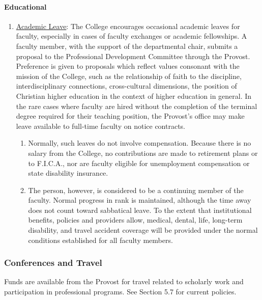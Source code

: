 			\paragraph{Educational}
				\begin{enumerate}[label=\alph*)]

					\item{\underline{Academic Leave}:  The College encourages occasional
						academic leaves for faculty, especially in cases of faculty exchanges or
						academic fellowships.  A faculty member, with the support of the
						departmental chair, submits a proposal to the Professional Development
						Committee through the Provost.  Preference is given to proposals which
						reflect values consonant with the mission of the College, such as the
						relationship of faith to the discipline, interdisciplinary connections,
						cross-cultural dimensions, the position of Christian higher education in
						the context of higher education in general.  In the rare cases where
						faculty are hired without the completion of the terminal degree required
						for their teaching position, the Provost's office may make leave
						available to full-time faculty on notice contracts.

						\begin{enumerate}[label=\arabic*)]

							\item{Normally, such leaves do not involve compensation.  Because there is no
								salary from the College, no contributions are made to retirement plans or to
								F.I.C.A., nor are faculty eligible for unemployment compensation or state
								disability insurance.}

							\item{The person, however, is considered to be a continuing member of the
								faculty. Normal progress in rank is maintained, although the time away does not
								count toward sabbatical leave.  To the extent that institutional benefits,
								policies and providers allow, medical, dental, life, long-term disability, and
								travel accident coverage will be provided under the normal conditions
								established for all faculty members.}

						\end{enumerate}
					}
				\end{enumerate}
		\subsubsection{Conferences and Travel}
			Funds are available from the Provost for travel related to scholarly work and participation in professional programs.  See Section 5.7 for current policies.
